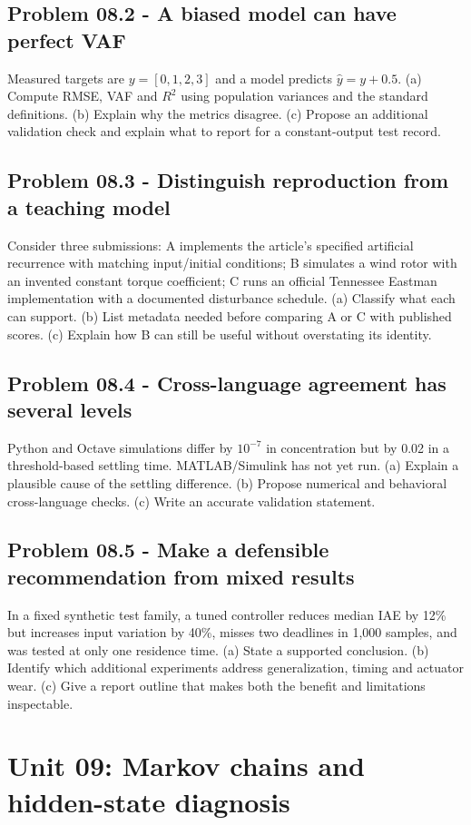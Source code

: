 \documentclass[11pt,a4paper]{article}
\begin{document}
\subsection{Problem 08.2 - A biased model can have perfect VAF}
Measured targets are $y=[0,1,2,3]$ and a model predicts $\hat y=y+0.5$. (a) Compute RMSE, VAF and $R^2$ using population variances and the standard definitions. (b) Explain why the metrics disagree. (c) Propose an additional validation check and explain what to report for a constant-output test record.

\subsection{Problem 08.3 - Distinguish reproduction from a teaching model}
Consider three submissions: A implements the article's specified artificial recurrence with matching input/initial conditions; B simulates a wind rotor with an invented constant torque coefficient; C runs an official Tennessee Eastman implementation with a documented disturbance schedule. (a) Classify what each can support. (b) List metadata needed before comparing A or C with published scores. (c) Explain how B can still be useful without overstating its identity.

\subsection{Problem 08.4 - Cross-language agreement has several levels}
Python and Octave simulations differ by $10^{-7}$ in concentration but by 0.02 in a threshold-based settling time. MATLAB/Simulink has not yet run. (a) Explain a plausible cause of the settling difference. (b) Propose numerical and behavioral cross-language checks. (c) Write an accurate validation statement.

\subsection{Problem 08.5 - Make a defensible recommendation from mixed results}
In a fixed synthetic test family, a tuned controller reduces median IAE by 12\% but increases input variation by 40\%, misses two deadlines in 1,000 samples, and was tested at only one residence time. (a) State a supported conclusion. (b) Identify which additional experiments address generalization, timing and actuator wear. (c) Give a report outline that makes both the benefit and limitations inspectable.


\clearpage\section{Unit 09: Markov chains and hidden-state diagnosis}
\end{document}

